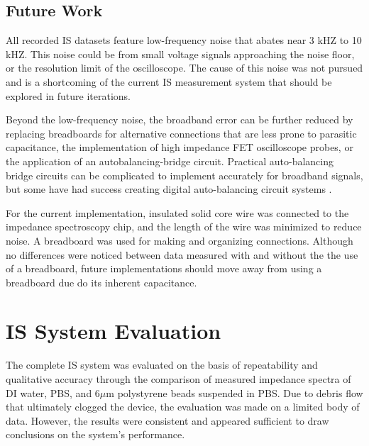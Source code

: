 


\subsection*{Future Work}

\par All recorded IS datasets feature low-frequency noise that abates near 3 kHZ to 10 kHZ. This noise could be from small voltage signals approaching the noise floor, or the resolution limit of the oscilloscope. The cause of this noise was not pursued and is a shortcoming of the current IS measurement system that should be explored in future iterations.

\par Beyond the low-frequency noise, the broadband error can be further reduced by replacing breadboards for alternative connections that are less prone to parasitic capacitance, the implementation of high impedance FET oscilloscope probes, or the application of an autobalancing-bridge circuit. Practical auto-balancing bridge circuits can be complicated to implement accurately for broadband signals, but some have had success creating digital auto-balancing circuit systems \cite{li_high-speed_2013}.

\par For the current implementation, insulated solid core wire was connected to the impedance spectroscopy chip, and the length of the wire was minimized to reduce noise. A breadboard was used for making and organizing connections. Although no differences were noticed between data measured with and without the the use of a breadboard, future implementations should move away from using a breadboard due do its inherent capacitance.

\section{IS System Evaluation}

\par The complete IS system was evaluated on the basis of repeatability and qualitative accuracy through the comparison of measured impedance spectra of DI water, PBS, and 6$\mu$m polystyrene beads suspended in PBS. Due to debris flow that ultimately clogged the device, the evaluation was made on a limited body of data. However, the results were consistent and appeared sufficient to draw conclusions on the system's performance.

